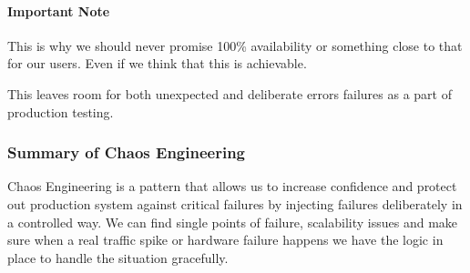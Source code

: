 \paragraph{Important Note}
This is why we should never promise 100\% availability or something close to that for our users.
Even if we think that this is achievable.

This leaves room for both unexpected and deliberate errors failures as a part of production testing.

\subsubsection{Summary of Chaos Engineering}
Chaos Engineering is a pattern that allows us to increase confidence and protect out production system against critical failures by injecting failures deliberately in a controlled way.
We can find single points of failure, scalability issues and make sure when a real traffic spike or hardware failure happens we have the logic in place to handle the situation gracefully.
